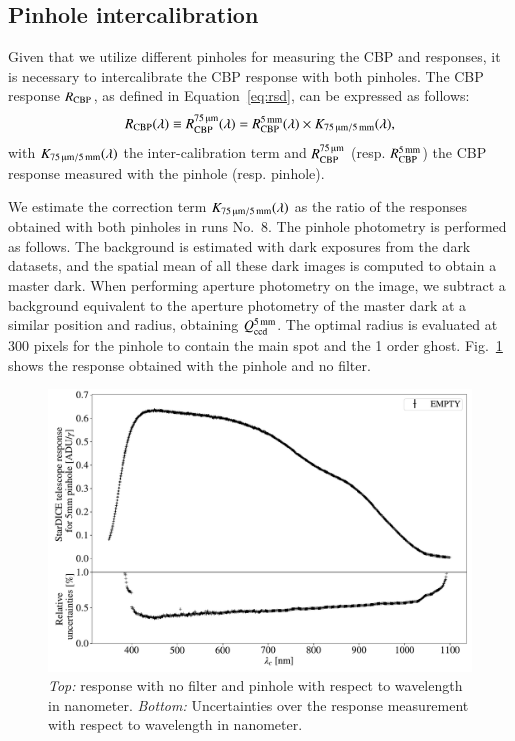 \subsection{Pinhole intercalibration}

Given that we utilize different pinholes for measuring the CBP and \SD responses, it is necessary to intercalibrate the CBP response with both pinholes. The CBP response $R_{\mathrm{CBP}}$, as defined in Equation~\ref{eq:rsd}, can be expressed as follows:
\begin{equation}
  \label{eq:K}
	R_{\mathrm{CBP}}(\lambda) \equiv R_{\mathrm{CBP}}^{\SI{75}{\micro\meter}}(\lambda) = R_{\mathrm{CBP}}^{\SI{5}{\milli\meter}}(\lambda) \times K_\mathrm{\SI{75}{\micro\meter}/\SI{5}{\milli\meter}}(\lambda),
\end{equation}
with $K_\mathrm{\SI{75}{\micro\meter}/\SI{5}{\milli\meter}}(\lambda)$ the inter-calibration term and $R_{\mathrm{CBP}}^{\SI{75}{\micro\meter}}$ (resp. $R_{\mathrm{CBP}}^{\SI{5}{\milli\meter}}$) the CBP response measured with the \spinhole pinhole (resp. \bpinhole pinhole). 

We estimate the correction term $K_\mathrm{\SI{75}{\micro\meter}/\SI{5}{\milli\meter}}(\lambda)$ as the ratio of the \SD responses obtained with both pinholes in runs No.~8. The \bpinhole pinhole photometry is performed as follows. The background is estimated with dark exposures from the dark datasets, and the spatial mean of all these dark images is computed to obtain a master dark. When performing aperture photometry on the \bpinhole image, we subtract a background equivalent to the aperture photometry of the master dark at a similar position and radius, obtaining $Q_{\mathrm{ccd}}^{\SI{5}{\milli\meter}}$. The optimal radius is evaluated at 300 pixels for the \bpinhole pinhole to contain the main spot and the 1 order ghost. Fig.~\ref{fig:stardice_5mm_response} shows the \SD response obtained with the \bpinhole pinhole and no filter. 


\begin{figure}%
    \centering
    \includegraphics[width=\columnwidth]{fig/stardice_5mm_response.pdf}
    \caption{\textit{Top:} \SD response with no filter and \bpinhole pinhole with respect to wavelength in nanometer. \textit{Bottom:} Uncertainties over the \SD response measurement with respect to wavelength in nanometer.}
    \label{fig:stardice_5mm_response}
\end{figure}


